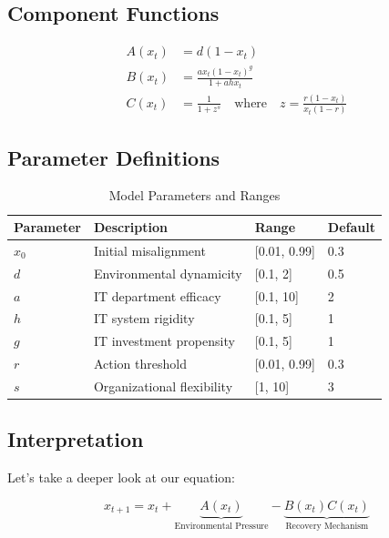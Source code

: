 \documentclass[a4paper, 10pt]{article}
\begin{document}
\subsection{Component Functions}
\begin{align}
	A(x_t) & = d(1 - x_t)                                                                     \\
	B(x_t) & = \frac{a x_t (1 - x_t)^g}{1 + a h x_t}                                          \\
	C(x_t) & = \frac{1}{1 + z^s} \quad \text{where} \quad z = \frac{r (1 - x_t)}{x_t (1 - r)}
\end{align}

\subsection{Parameter Definitions}
\begin{table}[h]
	\centering
	\caption{Model Parameters and Ranges}
	\begin{tabular}{llll}
		\toprule
		\textbf{Parameter} & \textbf{Description}       & \textbf{Range} & \textbf{Default} \\
		\midrule
		$x_0$              & Initial misalignment       & [0.01, 0.99]   & 0.3              \\
		$d$                & Environmental dynamicity   & [0.1, 2]      & 0.5              \\
		$a$                & IT department efficacy     & [0.1, 10]      & 2                \\
		$h$                & IT system rigidity         & [0.1, 5]       & 1                \\
		$g$                & IT investment propensity   & [0.1, 5]       & 1                \\
		$r$                & Action threshold           & [0.01, 0.99]   & 0.3              \\
		$s$                & Organizational flexibility & [1, 10]        & 3                \\
		\bottomrule
	\end{tabular}
\end{table}

\subsection{Interpretation}
Let's take a deeper look at our equation:

\begin{equation}
	x_{t + 1} = x_t + \underbrace{A(x_t)}_{\text{Environmental Pressure}} - \underbrace{B(x_t)C(x_t)}_{\text{Recovery Mechanism}}
\end{equation}
\end{document}
